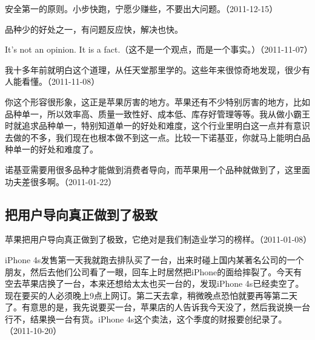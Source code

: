 安全第一的原则。小步快跑，宁愿少赚些，不要出大问题。（2011-12-15）


品种少的好处之一，有问题反应快，解决也快。


It's not an opinion. It is a fact.（这不是一个观点，而是一个事实。）（2011-11-07）

我十多年前就明白这个道理，从任天堂那里学的。这些年来很惊奇地发现，很少有人能看懂。（2011-11-08）


你这个形容很形象，这正是苹果厉害的地方。苹果还有不少特别厉害的地方，比如品种单一，所以效率高、质量一致性好、成本低、库存好管理等等。我从做小霸王时就追求品种单一，特别知道单一的好处和难度，这个行业里明白这一点并有意识去做的不多，我们现在也根本做不到这一点。比较一下诺基亚，你就马上能明白品种单一的好处和难度了。

诺基亚需要用很多品种才能做到消费者导向，而苹果用一个品种就做到了，这里面功夫差很多啊。（2011-01-22）

\subsection{把用户导向真正做到了极致}

苹果把用户导向真正做到了极致，它绝对是我们制造业学习的榜样。（2011-01-08）

iPhone 4s发售第一天我就跑去排队买了一台，出来时碰上国内某著名公司的一个朋友，然后去他们公司看了一眼，回车上时居然把iPhone的面给摔裂了。今天有空去苹果店换了一台，本来还想给太太也买一台的，发现iPhone 4s已经卖空了。现在要买的人必须晚上9点上网订。第二天去拿，稍微晚点恐怕就要再等第二天了。有意思的是，我先说要买一台，苹果店的人告诉我今天没了，然后我说换一台行不，结果换一台有货。iPhone 4s这个卖法，这个季度的财报要创纪录了。（2011-10-20）


